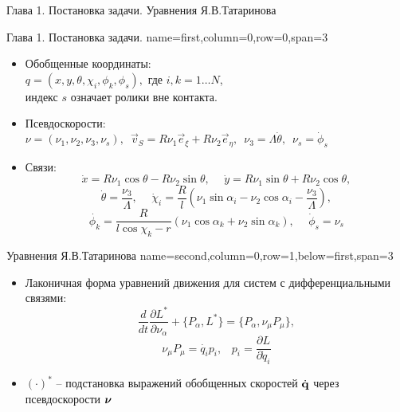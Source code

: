 \begin{myposter}{
    Глава 1. Постановка задачи. Уравнения Я.В.Татаринова
}

    \headerbox
    {Глава 1. Постановка задачи. }
    {name=first,column=0,row=0,span=3}
    {
        {\huge\bf
            \vspace{10pt}
            \begin{itemize}
                \item {
                    Обобщенные координаты: \\
                    $q = (x, y, \theta, \chi_i, \phi_k, \phi_s),$ где $i,k = 1\dots N$, \\
                    индекс $s$ означает ролики вне контакта.
                }
                \item{
                    Псевдоскорости:\\
                    \hspace{-15pt}
                    $\nu = (\nu_1, \nu_2, \nu_3, \nu_s), \enspace \vec{v}_S = R\nu_1\vec{e}_\xi + R\nu_2\vec{e}_\eta, \enspace \nu_3 = \Lambda\dot{\theta}, \enspace \nu_s = \dot{\phi}_s$
                }
                \item {
                    Связи:
                    $$ \dot{x} = R \nu_1\cos\theta-R\nu_2\sin\theta, \hspace{15pt} \dot{y} = R\nu_1\sin\theta+R\nu_2\cos\theta,$$
                    $$\dot{\theta} = \frac{\nu_3}{\Lambda}, \hspace{15pt} \dot{\chi}_i = \frac{R}{l}(\nu_1\sin\alpha_i - \nu_2\cos\alpha_i - \frac{\nu_3}{\Lambda}), $$
                    $$ \dot{\phi_k} = \frac{R}{l\cos\chi_k-r}(\nu_1\cos\alpha_k + \nu_2\sin\alpha_k), \hspace{15pt} \dot{\phi}_s = \nu_s $$
                }
            \end{itemize}
            \vspace{10pt}
        }
    }
    
    \headerbox
    {Уравнения Я.В.Татаринова}
    {name=second,column=0,row=1,below=first,span=3}
    {
        {\huge\bf
            \vspace{10pt}
            \begin{itemize}
                \item {
                    Лаконичная форма уравнений движения для систем с дифференциальными связями:
                    \begin{equation}\label{Tatarinov}
                        \frac{d}{dt}\frac{\partial L^{*}}{\partial \nu_\alpha}  + \{P_\alpha, L^{*}\} = \{P_\alpha, \nu_\mu P_\mu\},
                    \end{equation}
                    $$ \nu_\mu P_\mu = \dot{q_i} p_i, \hspace{10pt} p_i = \frac{\partial L}{\partial \dot{q}_i} $$
                }
                \item {
                    $(\cdot)^{*}$ -- подстановка выражений обобщенных скоростей $\dot{\mathbf{q}}$ через псевдоскорости $\boldsymbol{\mathbf{\nu}}$
                }
            \end{itemize}
            \vspace{10pt}
        }
    }

\end{myposter}
